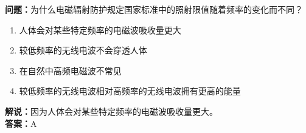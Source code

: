 \documentclass[UTF8]{ctexbook}
\begin{document}
\textbf{问题：}为什么电磁辐射防护规定国家标准中的照射限值随着频率的变化而不同？
\begin{enumerate}[label=\Alph*), leftmargin=3em]
  \item 人体会对某些特定频率的电磁波吸收量更大
  \item 较低频率的无线电波不会穿透人体
  \item 在自然中高频电磁波不常见
  \item 较低频率的无线电波相对高频率的无线电波拥有更高的能量
\end{enumerate}
\textbf{解说：}因为人体会对某些特定频率的电磁波吸收量更大。\\
\textbf{答案：}A


\end{document}
